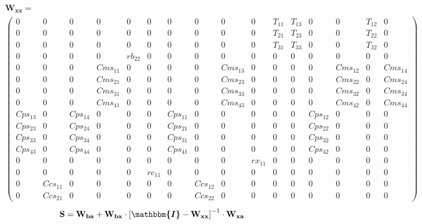 \begin{multline*} \mathbf{W_{xx}}=\\\left(\begin{smallmatrix} 0 & 0 & 0 & 0 & 0 & 0 &
0 & 0 & 0 & 0 & T_{11} & T_{13} & 0 & 0 & T_{12} & 0 \\ 0 & 0 & 0 & 0
& 0 & 0 & 0 & 0 & 0 & 0 & T_{21} & T_{23} & 0 & 0 & T_{22} & 0 \\ 0 &
0 & 0 & 0 & 0 & 0 & 0 & 0 & 0 & 0 & T_{31} & T_{33} & 0 & 0 & T_{32} &
0 \\ 0 & 0 & 0 & 0 & rb_{22} & 0 & 0 & 0 & 0 & 0 & 0 & 0 & 0 & 0 & 0 &
0 \\ 0 & 0 & 0 & Cms_{11} & 0 & 0 & 0 & 0 & Cms_{13} & 0 & 0 & 0 & 0 &
Cms_{12} & 0 & Cms_{14} \\ 0 & 0 & 0 & Cms_{21} & 0 & 0 & 0 & 0 &
Cms_{23} & 0 & 0 & 0 & 0 & Cms_{22} & 0 & Cms_{24} \\ 0 & 0 & 0 &
Cms_{31} & 0 & 0 & 0 & 0 & Cms_{33} & 0 & 0 & 0 & 0 & Cms_{32} & 0 &
Cms_{34} \\ 0 & 0 & 0 & Cms_{41} & 0 & 0 & 0 & 0 & Cms_{43} & 0 & 0 &
0 & 0 & Cms_{42} & 0 & Cms_{44} \\ Cps_{13} & 0 & Cps_{14} & 0 & 0 & 0
& Cps_{11} & 0 & 0 & 0 & 0 & 0 & Cps_{12} & 0 & 0 & 0 \\ Cps_{23} & 0
& Cps_{24} & 0 & 0 & 0 & Cps_{21} & 0 & 0 & 0 & 0 & 0 & Cps_{22} & 0 &
0 & 0 \\ Cps_{33} & 0 & Cps_{34} & 0 & 0 & 0 & Cps_{31} & 0 & 0 & 0 &
0 & 0 & Cps_{32} & 0 & 0 & 0 \\ Cps_{43} & 0 & Cps_{44} & 0 & 0 & 0 &
Cps_{41} & 0 & 0 & 0 & 0 & 0 & Cps_{42} & 0 & 0 & 0 \\ 0 & 0 & 0 & 0 &
0 & 0 & 0 & 0 & 0 & rx_{11} & 0 & 0 & 0 & 0 & 0 & 0 \\ 0 & 0 & 0 & 0 &
0 & rc_{11} & 0 & 0 & 0 & 0 & 0 & 0 & 0 & 0 & 0 & 0 \\ 0 & Ccs_{11} &
0 & 0 & 0 & 0 & 0 & Ccs_{12} & 0 & 0 & 0 & 0 & 0 & 0 & 0 & 0 \\ 0 &
Ccs_{21} & 0 & 0 & 0 & 0 & 0 & Ccs_{22} & 0 & 0 & 0 & 0 & 0 & 0 & 0 &
0 \end{smallmatrix}\right)\end{multline*}
\[ \mathbf{S}=\mathbf{W_{ba}}+\mathbf{W_{bx}}\cdot\left[
\boldsymbol{\mathbbm{I}}
-\mathbf{W_{xx}}\right]^{-1}\cdot\mathbf{W_{xa}} \]
